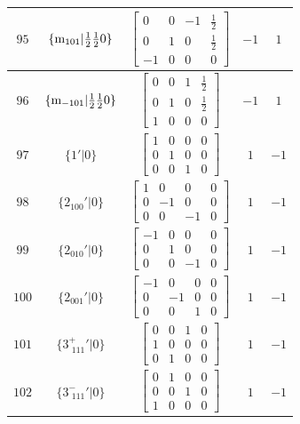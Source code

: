 \documentclass[fleqn,8pt]{jsarticle}
\begin{document}
\begin{longtable}{ccccc}
$ 95 $ & $ \{{\rm m}_{101}|\frac{1}{2} \frac{1}{2} 0\} $ & $ \begin{bmatrix} 0 & 0 & -1 & \frac{1}{2} \\ 0 & 1 & 0 & \frac{1}{2} \\ -1 & 0 & 0 & 0 \end{bmatrix} $ & $ -1 $ & $ 1 $ \\ \hline
$ 96 $ & $ \{{\rm m}_{-101}|\frac{1}{2} \frac{1}{2} 0\} $ & $ \begin{bmatrix} 0 & 0 & 1 & \frac{1}{2} \\ 0 & 1 & 0 & \frac{1}{2} \\ 1 & 0 & 0 & 0 \end{bmatrix} $ & $ -1 $ & $ 1 $ \\ \hline
$ 97 $ & $ \{1{}'|0\} $ & $ \begin{bmatrix} 1 & 0 & 0 & 0 \\ 0 & 1 & 0 & 0 \\ 0 & 0 & 1 & 0 \end{bmatrix} $ & $ 1 $ & $ -1 $ \\ \hline
$ 98 $ & $ \{2{}_{100}{}'|0\} $ & $ \begin{bmatrix} 1 & 0 & 0 & 0 \\ 0 & -1 & 0 & 0 \\ 0 & 0 & -1 & 0 \end{bmatrix} $ & $ 1 $ & $ -1 $ \\ \hline
$ 99 $ & $ \{2{}_{010}{}'|0\} $ & $ \begin{bmatrix} -1 & 0 & 0 & 0 \\ 0 & 1 & 0 & 0 \\ 0 & 0 & -1 & 0 \end{bmatrix} $ & $ 1 $ & $ -1 $ \\ \hline
$ 100 $ & $ \{2{}_{001}{}'|0\} $ & $ \begin{bmatrix} -1 & 0 & 0 & 0 \\ 0 & -1 & 0 & 0 \\ 0 & 0 & 1 & 0 \end{bmatrix} $ & $ 1 $ & $ -1 $ \\ \hline
$ 101 $ & $ \{3^{+}_{\,\,111}{}'|0\} $ & $ \begin{bmatrix} 0 & 0 & 1 & 0 \\ 1 & 0 & 0 & 0 \\ 0 & 1 & 0 & 0 \end{bmatrix} $ & $ 1 $ & $ -1 $ \\ \hline
$ 102 $ & $ \{3^{-}_{\,\,111}{}'|0\} $ & $ \begin{bmatrix} 0 & 1 & 0 & 0 \\ 0 & 0 & 1 & 0 \\ 1 & 0 & 0 & 0 \end{bmatrix} $ & $ 1 $ & $ -1 $ \\ \hline

\end{longtable}
\end{document}
